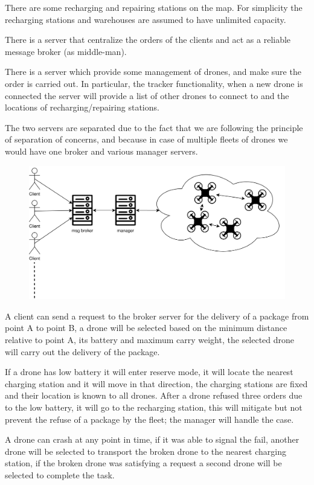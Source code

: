 \documentclass[a4paper, oneside]{memoir}
\begin{document}
There are some recharging and repairing stations on the map. For simplicity the recharging stations and warehouses are assumed to have unlimited capacity.

There is a server that centralize the orders of the clients and act as a reliable message broker (as middle-man).

There is a server which provide some management of drones, and make sure the order is carried out. In particular, the tracker functionality, when a new drone is connected the server will provide a list of other drones to connect to and the locations of recharging/repairing stations.

The two servers are separated due to the fact that we are following the principle of separation of concerns, and because in case of multiple fleets of drones we would have one broker and various manager servers.

\begin{figure}[h!]
	\centering
	\includegraphics[width=\linewidth]{Overview}
\end{figure}

A client can send a request to the broker server for the delivery of a package from point A to point B, a drone will be selected based on the minimum distance relative to point A, its battery and maximum carry weight, the selected drone will carry out the delivery of the package.

If a drone has low battery it will enter reserve mode, it will locate the nearest charging station and it will move in that direction, the charging stations are fixed and their location is known to all drones. After a drone refused three orders due to the low battery, it will go to the recharging station, this will mitigate but not prevent the refuse of a package by the fleet; the manager will handle the case.

A drone can crash at any point in time, if it was able to signal the fail, another drone will be selected to transport the broken drone to the nearest charging station, if the broken drone was satisfying a request a second drone will be selected to complete the task.
\end{document}
